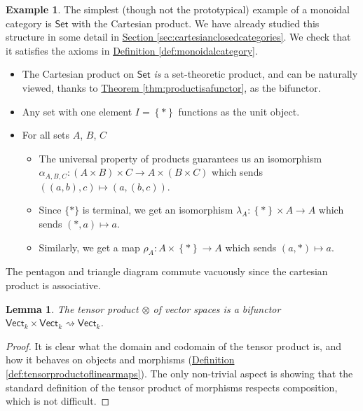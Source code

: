 \documentclass[a4paper]{report}
\theoremstyle{definition}
\newtheorem{example}{Example}[section]
\theoremstyle{plain}
\newtheorem{lemma}{Lemma}[section]
\theoremstyle{remark}
\begin{document}
\begin{example}
  \label{eg:setisamonoidalcategory}
  The simplest (though not the prototypical) example of a monoidal category is $\mathsf{Set}$ with the Cartesian product. We have already studied this structure in some detail in \hyperref[sec:cartesianclosedcategories]{Section \ref*{sec:cartesianclosedcategories}}. We check that it satisfies the axioms in \hyperref[def:monoidalcategory]{Definition \ref*{def:monoidalcategory}}.

  \begin{itemize}
    \item The Cartesian product on $\mathsf{Set}$ \emph{is} a set-theoretic product, and can be naturally viewed, thanks to \hyperref[thm:productisafunctor]{Theorem \ref*{thm:productisafunctor}}, as the bifunctor.

    \item Any set with one element $I = \left\{ * \right\}$ functions as the unit object.

    \item For all sets $A$, $B$, $C$
      \begin{itemize}
        \item The universal property of products guarantees us an isomorphism $\alpha_{A,B,C}\colon (A \times B) \times C \to A \times (B \times C)$ which sends $((a,b),c) \mapsto (a,(b,c))$.

        \item Since $\{*\}$ is terminal, we get an isomorphism $\lambda_{A}\colon \left\{ * \right\}\times A \to A$ which sends $(*,a) \mapsto a$.

        \item Similarly, we get a map $\rho_{A}\colon A \times\left\{ * \right\} \to A$ which sends $(a, *) \mapsto a$.
      \end{itemize}
  \end{itemize}

  The pentagon and triangle diagram commute vacuously since the cartesian product is associative.
\end{example}

\begin{lemma}
  The tensor product $\otimes$ of vector spaces is a bifunctor $\mathsf{Vect}_{k} \times \mathsf{Ve ct}_{k} \rightsquigarrow \mathsf{Vect}_{k}$.
\end{lemma}
\begin{proof}
  It is clear what the domain and codomain of the tensor product is, and how it behaves on objects and morphisms (\hyperref[def:tensorproductoflinearmaps]{Definition \ref*{def:tensorproductoflinearmaps}}). The only non-trivial aspect is showing that the standard definition of the tensor product of morphisms respects composition, which is not difficult.
\end{proof}
\end{document}
